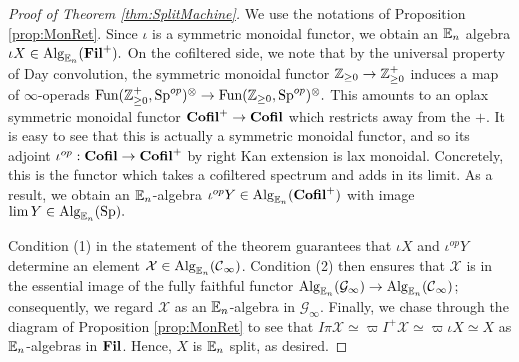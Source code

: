 \begin{proof}[Proof of Theorem \ref{thm:SplitMachine}]
We use the notations of Proposition \ref{prop:MonRet}.  Since $\iota$ is a symmetric monoidal functor, we obtain an $\operatorname{\mathbb{E}}_n$ algebra $\iota X \in \operatorname{\mathrm{Alg}}_{\operatorname{\mathbb{E}}_n}(\operatorname{\mathbf{Fil}}^+).$  
On the cofiltered side, we note that by the universal property of Day convolution, the symmetric monoidal functor $\operatorname{\mathbb{Z}}_{\geq 0} \to \operatorname{\mathbb{Z}}_{\geq 0}^+$ induces a map of $\infty$-operads $\operatorname{\text{Fun}}(\operatorname{\mathbb{Z}}_{\geq 0}^+, \operatorname{\mathrm{Sp}}^{op})^{\otimes} \to \operatorname{\text{Fun}}(\operatorname{\mathbb{Z}}_{\geq 0},\operatorname{\mathrm{Sp}}^{op})^{\otimes}.$  This amounts to an oplax symmetric monoidal functor $\operatorname{\mathbf{Cofil}}^+\to \operatorname{\mathbf{Cofil}}$ which restricts away from the $+$.  It is easy to see that this is actually a symmetric monoidal functor, and so its adjoint $\iota^{op}: \operatorname{\mathbf{Cofil}} \to \operatorname{\mathbf{Cofil}}^+$ by right Kan extension is lax monoidal.  Concretely, this is the functor which takes a cofiltered spectrum and adds in its limit.  As a result, we obtain an $\operatorname{\mathbb{E}}_n$-algebra $\iota^{op}Y \in \operatorname{\mathrm{Alg}}_{\operatorname{\mathbb{E}}_n}(\operatorname{\mathbf{Cofil}}^+)$ with image $\lim Y\in \operatorname{\mathrm{Alg}}_{\operatorname{\mathbb{E}}_n}(\operatorname{\mathrm{Sp}}).$  

Condition (1) in the statement of the theorem guarantees that $\iota X$ and $\iota^{op}Y$ determine an element $\mathcal{X} \in \operatorname{\mathrm{Alg}}_{\operatorname{\mathbb{E}}_n}(\operatorname{\mathcal{C}}_{\infty})$.  Condition (2) then ensures that $\mathcal{X}$ is in the essential image of the fully faithful functor $\operatorname{\mathrm{Alg}}_{\operatorname{\mathbb{E}}_n}(\mathcal{G}_\infty) \to \operatorname{\mathrm{Alg}}_{\operatorname{\mathbb{E}}_n}(\operatorname{\mathcal{C}}_\infty)$; consequently, we regard $\mathcal{X}$ as an $\operatorname{\mathbb{E}}_n$-algebra in $\mathcal{G}_{\infty}$.  Finally, we chase through the diagram of Proposition \ref{prop:MonRet} to see that $I\pi \mathcal{X} \simeq \varpi I^+ \mathcal{X} \simeq \varpi \iota X \simeq X$ as $\operatorname{\mathbb{E}}_n$-algebras in $\operatorname{\mathbf{Fil}}$.   Hence, $X$ is $\operatorname{\mathbb{E}}_n$ split, as desired. 
\end{proof}




